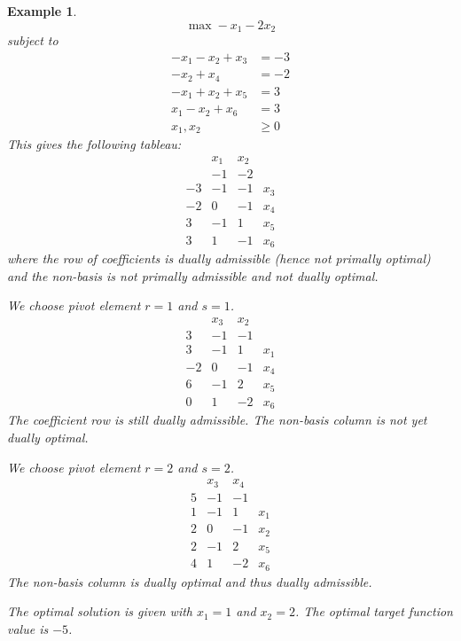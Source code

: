 \documentclass[a4paper]{article}
\numberwithin{lecref}{subsection}
\newcounter{exercises}
\newtheorem{example}[exercises]{Example}
\begin{document}
\begin{example}
	\[ \max -x_1 - 2x_2 \]
	subject to
	\begin{align*}
		-x_1 - x_2 + x_3 &= -3 \\
		-x_2 + x_4 &= -2 \\
		-x_1 + x_2 + x_5 &= 3 \\
		x_1 - x_2 + x_6 &= 3 \\
		x_1, x_2 &\geq 0
	\end{align*}
	This gives the following tableau:
	\[\begin{array}{c|ccc}
		   & x_1 & x_2 & \\
		   & -1 & -2 & \\
		\hline
		-3 & -1 & -1 & x_3 \\
		-2 & 0 & -1 & x_4 \\
		3  & -1 & 1 & x_5 \\
		3  & 1 & -1 & x_6
	\end{array}\]
	where the row of coefficients is dually admissible (hence not primally optimal) and the non-basis is not primally admissible and not dually optimal.

	We choose pivot element $r = 1$ and $s = 1$.
	\[\begin{array}{c|ccc}
		   & x_3 & x_2 & \\
		3  & -1 & -1 & \\
		\hline
		3 & -1 & 1 & x_1 \\
		-2 & 0 & -1 & x_4 \\
		6  & -1 & 2 & x_5 \\
		0  & 1 & -2 & x_6
	\end{array}\]
	The coefficient row is still dually admissible. The non-basis column is not yet dually optimal.

	We choose pivot element $r = 2$ and $s = 2$.
	\[\begin{array}{c|ccc}
		   & x_3 & x_4 & \\
		5  & -1 & -1 & \\
		\hline
		1 & -1 & 1 & x_1 \\
		2 & 0 & -1 & x_2 \\
		2 & -1 & 2 & x_5 \\
		4 & 1 & -2 & x_6
	\end{array}\]
	The non-basis column is dually optimal and thus dually admissible.

	The optimal solution is given with $x_1 = 1$ and $x_2 = 2$. The optimal target function value is $-5$.
\end{example}
\end{document}
